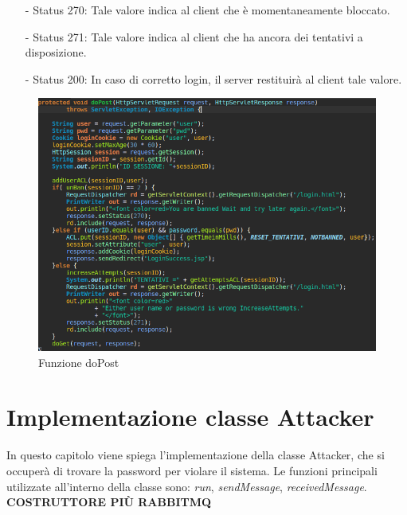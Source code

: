 \documentclass[a4paper,12pt,titlepage,oneside,openany]{book}
\begin{document}
\begin{itemize}
	\item[-] Status 270: Tale valore indica al client che è momentaneamente bloccato.
	\item[-] Status 271: Tale valore indica al client che ha ancora dei tentativi a disposizione.
	\item[-] Status 200: In caso di corretto login, il server restituirà al client tale valore.
\end{itemize}
\begin{figure}[H]
	\centering
	\includegraphics[scale=0.5]{dopost.png}
	\caption{Funzione doPost}
	\label{fig:dopost}
\end{figure}

\chapter{Implementazione classe Attacker}
In questo capitolo viene spiega l'implementazione della classe Attacker, che si occuperà di trovare la password per violare il sistema. Le funzioni principali utilizzate all'interno della classe sono: \textit{run}, \textit{sendMessage}, \textit{receivedMessage}. \textbf{COSTRUTTORE PIÙ RABBITMQ} 
\end{document}
